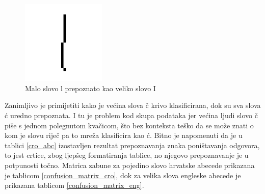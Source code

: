  \begin{figure}[htb]
    \centering
    \includegraphics[width=4cm]{images/letter_l.png}
    \caption{Malo slovo l prepoznato kao veliko slovo I}
    \label{fig:letter_l}
\end{figure}
Zanimljivo je primijetiti kako je većina slova č krivo klasificirana, dok su sva slova ć uredno prepoznata. I tu je problem kod skupa podataka jer većina ljudi slovo č piše s jednom polegnutom kvačicom, što bez konteksta teško da se može znati o kom je slovu riječ pa to mreža klasificira kao ć. Bitno je napomenuti da je u tablici \ref{cro_abc} izostavljen rezultat prepoznavanja znaka poništavanja odgovora, to jest crtice, zbog ljepšeg formatiranja tablice, no njegovo prepoznavanje je u potpunosti točno. Matrica zabune za pojedino slovo hrvatske abecede prikazana je tablicom \ref{confusion_matrix_cro}, dok za velika slova engleske abecede je prikazana tablicom \ref{confusion_matrix_eng}.

